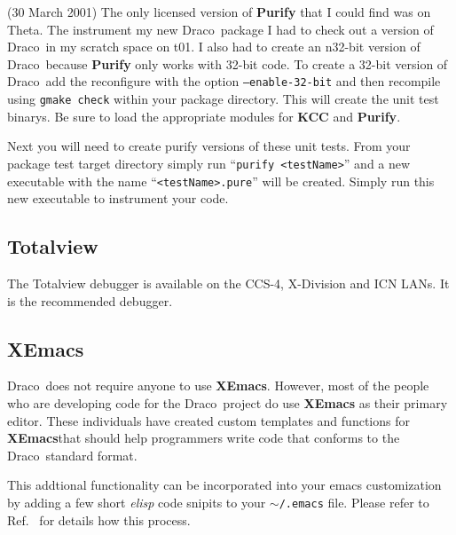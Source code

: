 \documentclass[10pt]{nmemo}
\newcommand{\comp}[1]{\normalfont\normalsize\texttt{#1}}
\newcommand{\draco}{{\normalfont\sffamily Draco}}
\newcommand{\xemacs}{{\normalfont\bfseries XEmacs}}
\newcommand{\bash}{{\normalfont\bfseries Bash}}
\begin{document}
(30 March 2001) The only licensed version of \textbf{Purify} that I
could find was on Theta.  The instrument my new \draco\ package I had
to check out a version of \draco\ in my scratch space on t01.  I also
had to create an n32-bit version of \draco\ because \textbf{Purify}
only works with 32-bit code.  To create a 32-bit version of \draco\
add the reconfigure with the option \comp{--enable-32-bit} and then
recompile using \comp{gmake check} within your package directory.
This will create the unit test binarys.  Be sure to load the
appropriate modules for \textbf{KCC} and \textbf{Purify}.

Next you will need to create purify versions of these unit tests.
From your package test target directory simply run ``\comp{purify
 <testName>}'' and a new executable with the name
``\comp{<testName>.pure}'' will be created.  Simply run this new
executable to instrument your code.

\subsection{Totalview}

The Totalview debugger is available on the CCS-4, X-Division and ICN
LANs.  It is the recommended debugger.

\subsection{\xemacs}

\draco\ does not require anyone to use \xemacs.  However, most of the
people who are developing code for the \draco\ project do use \xemacs
as their primary editor.  These individuals have created custom
templates and functions for \xemacs that should help programmers write 
code that conforms to the \draco\ standard format.

This addtional functionality can be incorporated into your emacs
customization by adding a few short \emph{elisp} code snipits to your
\comp{$\sim$/.emacs} file.  Please refer to Ref.~\cite{xtm:9909} for
details how this process.


\end{document}
